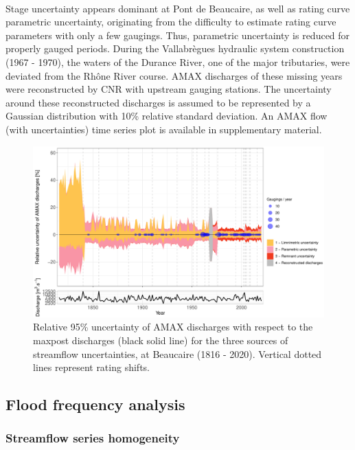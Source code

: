 \documentclass[11pt]{article}
\begin{document}
    \paragraph{} Stage uncertainty appears dominant at Pont de Beaucaire, as well as rating curve parametric uncertainty, originating from the difficulty to estimate rating curve parameters with only a few gaugings. Thus, parametric uncertainty is reduced for properly gauged periods. During the Vallabrègues hydraulic system construction (1967 - 1970), the waters of the Durance River, one of the major tributaries, were deviated from the Rhône River course. AMAX discharges of these missing years were reconstructed by CNR with upstream gauging stations. The uncertainty around these reconstructed discharges is assumed to be represented by a Gaussian distribution with 10\% relative standard deviation. An AMAX flow (with uncertainties) time series plot is available in supplementary material.
    
    \begin{figure}[h!]
        \centering
        \includegraphics[width=\textwidth]{Figs/9-IcAndAMAX.pdf}
        \caption{Relative 95\% uncertainty of AMAX discharges with respect to the maxpost discharges (black solid line) for the three sources of streamflow uncertainties, at Beaucaire (1816 - 2020). Vertical dotted lines represent rating shifts.}
        \label{fig:ICtot_both}
    \end{figure}
    \FloatBarrier
   
    \subsection{Flood frequency analysis}
    
        \subsubsection{Streamflow series homogeneity}
           
\end{document}
